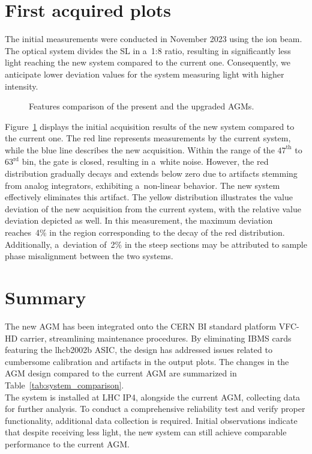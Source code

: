 \section{First acquired plots}
The initial measurements were conducted in November 2023 using the ion beam.
The optical system divides the SL in a~1:8 ratio, resulting in significantly
less light reaching the new system compared to the current one. Consequently,
we anticipate lower deviation values for the system measuring light with higher
intensity.
\begin{figure}[!htb]
    \begin{center}
        \scalebox{0.54}{}
        \caption{Features comparison of the present and the upgraded AGMs.}
        \label{fig:comparison_chart}
    \end{center}
\end{figure}
Figure~\ref{fig:comparison_chart} displays the initial acquisition results of the new system compared to the current one. The red line represents
measurements by the current system, while the blue line describes the new
acquisition. Within the range of the $47^{\text{th}}$ to $63^{\text{rd}}$ bin, the gate is closed,
resulting in a~white noise. However, the red distribution gradually decays and extends
below zero due to artifacts stemming from analog integrators,
exhibiting a~non-linear behavior. The new system effectively eliminates this
artifact. The yellow distribution illustrates the value deviation of the new
acquisition from the current system, with the relative value deviation depicted
as well. In this measurement, the maximum deviation reaches~4\% in the region
corresponding to the decay of the red distribution. Additionally, a~deviation of~2\% in
the steep sections may be attributed to sample phase misalignment between the two systems.

\section{Summary}
The new AGM has been integrated onto the CERN BI standard platform VFC-HD
carrier, streamlining maintenance procedures. By eliminating IBMS cards
featuring the lhcb2002b ASIC, the design has addressed issues related to
cumbersome calibration and artifacts in the output plots. The changes in the
AGM design compared to the current AGM are summarized in
Table~\ref{tab:system_comparison}.\\
The system is installed at LHC IP4, alongside the current AGM, collecting
data for further analysis. To conduct a comprehensive reliability test and
verify proper functionality, additional data collection is required. Initial
observations indicate that despite receiving less light, the new system can
still achieve comparable performance to the current AGM.
 





